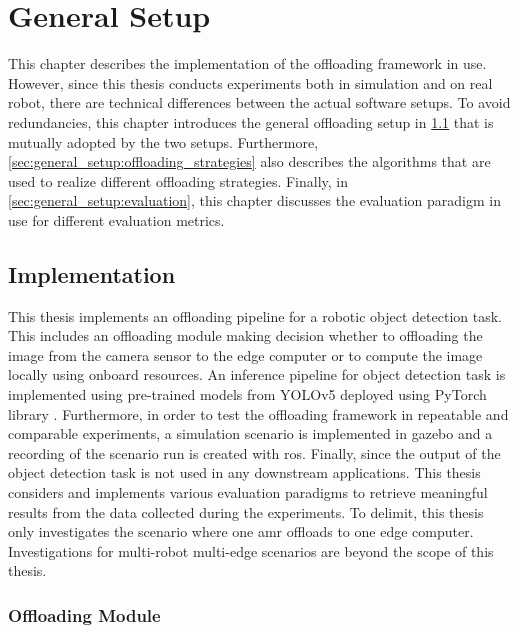 \chapter{General Setup}\label{ch:general_setup}

This chapter describes the implementation of the offloading framework in use. However, since this thesis conducts experiments both in simulation and on real robot, there are technical differences between the actual software setups. To avoid redundancies, this chapter introduces the general offloading setup in \cref{sec:general_setup:implementation} that is mutually adopted by the two setups. Furthermore, \cref{sec:general_setup:offloading_strategies} also describes the algorithms that are used to realize different offloading strategies. 
Finally, in \cref{sec:general_setup:evaluation}, this chapter discusses the evaluation paradigm in use for different evaluation metrics.

\section{Implementation}\label{sec:general_setup:implementation}

This thesis implements an offloading pipeline for a robotic object detection task. This includes an offloading module making decision whether to offloading the image from the camera sensor to the edge computer or to compute the image locally using onboard resources. An inference pipeline for object detection task is implemented using pre-trained models from YOLOv5 \cite{Jocher2022} deployed using PyTorch library \cite{Paszke2019}. Furthermore, in order to test the offloading framework in repeatable and comparable experiments, a simulation scenario is implemented in \gls{gazebo} \cite{Koenig2004} and a recording of the scenario run is created with \gls{ros}. Finally, since the output of the object detection task is not used in any downstream applications. This thesis considers and implements various evaluation paradigms to retrieve meaningful results from the data collected during the experiments. To delimit, this thesis only investigates the scenario where one \gls{amr} offloads to one edge computer. Investigations for multi-robot multi-edge scenarios are beyond the scope of this thesis. 

\subsection{Offloading Module}

